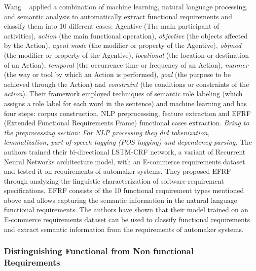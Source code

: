 Wang \etal~\cite{7949577} applied a combination of machine learning, natural
language processing, and semantic analysis to automatically extract functional
requirements and classify them into 10 different cases: Agentive (The main
participant of activities), \emph{action} (the main functional operation),
 \emph{objective} (the objects affected by the Action), \emph{agent mode} (the
 modifier or property of the Agentive), \emph{objmod} (the modifier or property
 of the Agentive), \emph{locational} (the location or
 destination of an Action), \emph{temporal} (the occurrence time or frequency of
 an Action), \emph{manner} (the way or tool by which an Action is performed),
 \emph{goal} (the purpose to be achieved through the Action) and
 \emph{constraint} (the conditions or constraints of the \emph{action}). Their
 framework employed techniques of semantic role labeling (which assigns a 
role  label  for  each  word  in  the  sentence) and
 machine learning and has four steps: corpus construction, NLP
 preprocessing, feature extraction and EFRF (Extended Functional Requirements
 Frame) functional cases extraction.
 \emph{Bring to the preprocessing section: For NLP processing they did
 tokenization, lemmatization, part-of-speech tagging (POS tagging) and
 dependency parsing.} The authors trained their bi-directional LSTM-CRF network,
 a variant of Recurrent Neural Networks architecture model, with an E-commerce
 requirements dataset and tested it on requirements of automaker systems. They
 proposed EFRF through analyzing the linguistic characterization of
 software requirement specifications. EFRF consists of the 10 functional requirement types mentioned
 above and allows capturing the semantic information in the natural language
 functional requirements. The authors have shown that their
 model trained on an E-commerce requirements dataset can be used to classify functional requirements and extract
 semantic information from the requirements of automaker systems.

\subsubsection{Distinguishing Functional from Non functional Requirements}

